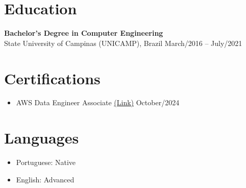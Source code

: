\documentclass[a4paper,10pt]{article}
\begin{document}
\section*{Education}
\textbf{Bachelor's Degree in Computer Engineering} \\ State University of Campinas (UNICAMP), Brazil \hfill March/2016 -- July/2021

\section*{Certifications}
\begin{itemize}[leftmargin=*]
    \item AWS Data Engineer Associate \href{https://www.credly.com/badges/40904cd1-1c10-43c5-809a-e4750b2f7ec5/linked_in_profile}{(Link)} \hfill October/2024
\end{itemize}

\section*{Languages}
\begin{itemize}[leftmargin=*]
    \item Portuguese: Native
    \item English: Advanced
\end{itemize}
\end{document}

